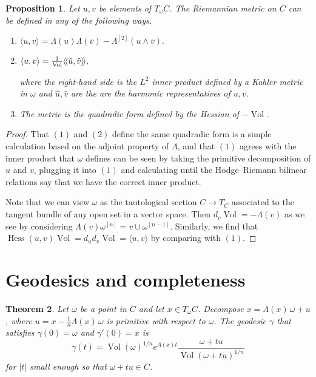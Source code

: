 \documentclass[11pt,a4paper]{amsart}
\newtheorem{theo}{Theorem}[section]
\newtheorem{prop}[theo]{Proposition}
\theoremstyle{definition}
\theoremstyle{remark}
\newcommand{\Vol}{\mathop{\mathrm{Vol}}}
\def\ov#1{\overline{#1}}
\def\kf{\omega}
\def\Lef{\Lambda}
\def\ton{u}
\def\ttw{v}
\def\^#1{^{[#1]}}
\begin{document}
\begin{prop}
Let $\ton,\ttw$ be elements of $T_{\kf}C$. The Riemannian metric on $C$
can be defined in any of the following ways.
\begin{enumerate}
    \item
\hfil
$
\langle \ton, \ttw \rangle
= \Lef(\ton)\Lef(\ov\ttw)
- \Lef\^2(\ton\wedge\ov\ttw).
$
\hfil
    \item 
$
\hfil
\langle\ton, \ttw \rangle
= 
\frac{1}{\Vol} \langle\!\langle \hat\ton, \hat\ttw \rangle\!\rangle,
\hfil
$

\noindent
where the right-hand side is the $L^2$ inner product defined by a Kahler
metric in $\kf$ and $\hat\ton,\hat\ttw$ are the are the harmonic
representatives of $\ton, \ttw$.

    \item
The metric is the quadradic form defined by the Hessian of $-\Vol$.
\end{enumerate}
\end{prop}


\begin{proof}
That $(1)$ and $(2)$ define the same quadradic form is a simple
calculation based on the adjoint property of $\Lef$, and that $(1)$
agrees with the inner product that $\kf$ defines can be seen by taking
the primitive decomposition of $\ton$ and $\ttw$, plugging it into $(1)$
and calculating until the Hodge--Riemann bilinear relations say that we
have the correct inner product.

Note that we can view $\kf$ as the tautological section $C \to T_C$
associated to the tangent bundle of any open set in a vector space.
Then $d_{\ttw} \Vol = -\Lef(\ttw)$ as we see by considering
$\Lef(\ttw) \kf\^n = \ttw \cup \kf\^{n-1}$. Similarly, we find that
$\operatorname{Hess}(\ton,\ttw) \Vol 
= d_{\ton} d_{\ttw}\Vol = \langle \ton, \ttw \rangle$ by comparing with
$(1)$.
\end{proof}





\section{Geodesics and completeness}


\begin{theo}
\label{theo:geodesics}
Let $\kf$ be a point in $C$ and let $x \in T_{\kf} C$. Decompose $x =
\Lef(x) \, \kf + u$, where $u = x - \frac{1}{n}\Lef(x)\,\kf$ is
primitive with respect to $\kf$.  The geodesic $\gamma$ that satisfies
$\gamma(0) = \kf$ and $\gamma'(0) = x$ is
$$
\gamma(t)
= \Vol(\kf)^{1/n} e^{\Lef(x)t} \frac{\kf + t u}{\Vol(\kf + t u)^{1/n}}
$$
for $|t|$ small enough so that $\kf + tu \in C$.
\end{theo}
\end{document}
